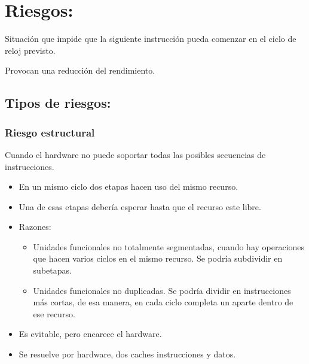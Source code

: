 \documentclass[12pt, twoside, openright]{report} %
\begin{document}
\section{Riesgos:}

Situación que impide que la siguiente instrucción pueda comenzar en el
ciclo de reloj previsto.

Provocan una reducción del rendimiento.

\subsection{Tipos de riesgos:}
\subsubsection{Riesgo estructural} Cuando el hardware no puede soportar todas las posibles secuencias de instrucciones.
\begin{itemize}
	\item En un mismo ciclo dos etapas hacen uso del mismo recurso.
	\item Una de esas etapas debería esperar hasta que el recurso este libre.
	\item Razones:
	      \begin{itemize}
		      \item Unidades funcionales no totalmente segmentadas, cuando hay operaciones que hacen varios ciclos en el mismo recurso. Se podría subdividir en subetapas.
		      \item Unidades funcionales no duplicadas. Se podría dividir en instrucciones más cortas, de esa manera, en cada ciclo completa un aparte dentro de ese recurso.
	      \end{itemize}

	\item Es evitable, pero encarece el hardware.
	\item Se resuelve por hardware, dos caches instrucciones y datos.
\end{itemize}
\end{document}
